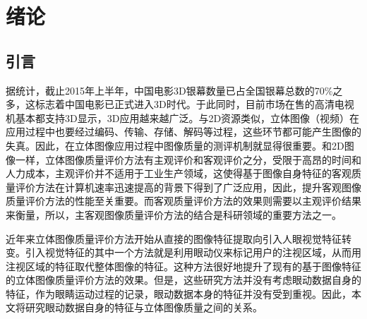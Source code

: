 
\chapter{绪论}
\label{chap:overview}



\section{引言}
\label{sec:introduction}
据统计，截止2015年上半年，中国电影3D银幕数量已占全国银幕总数的70\%之多，这标志着中国电影已正式进入3D时代。于此同时，目前市场在售的高清电视机基本都支持3D显示，3D应用越来越广泛。与2D资源类似，立体图像（视频）在应用过程中也要经过编码、传输、存储、解码等过程，这些环节都可能产生图像的失真。因此，在立体图像应用过程中图像质量的测评机制就显得很重要\parencite{galkandage2015full}。和2D图像一样，立体图像质量评价方法有主观评价和客观评价之分，受限于高昂的时间和人力成本，主观评价并不适用于工业生产领域，这使得基于图像自身特征的客观质量评价方法在计算机速率迅速提高的背景下得到了广泛应用，因此，提升客观图像质量评价方法的性能至关重要。而客观质量评价方法的效果则需要以主观评价结果来衡量，所以，主客观图像质量评价方法的结合是科研领域的重要方法之一。

近年来立体图像质量评价方法开始从直接的图像特征提取向引入人眼视觉特征转变\parencite{bensalma2013perceptual,engelke2011visual,hachicha2013stereo,ryu2014no}。引入视觉特征的其中一个方法就是利用眼动仪来标记用户的注视区域，从而用注视区域的特征取代整体图像的特征\parencite{ninassi2007does}。这种方法很好地提升了现有的基于图像特征的立体图像质量评价方法的效果\parencite{liu2009studying,liu2011visual}。但是，这些研究方法并没有考虑眼动数据自身的特征，作为眼睛运动过程的记录，眼动数据本身的特征并没有受到重视。因此，本文将研究眼动数据自身的特征与立体图像质量之间的关系。

